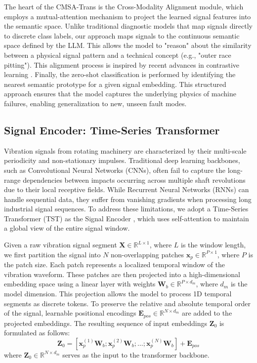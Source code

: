 \documentclass[journal]{IEEEtran}
\begin{document}
The heart of the CMSA-Trans is the Cross-Modality Alignment module, which employs a mutual-attention mechanism to project the learned signal features into the semantic space. Unlike traditional diagnostic models that map signals directly to discrete class labels, our approach maps signals to the continuous semantic space defined by the LLM. This allows the model to "reason" about the similarity between a physical signal pattern and a technical concept (e.g., "outer race pitting"). This alignment process is inspired by recent advances in contrastive learning \cite{radford2021learning, oord2018representation, chen2020simple}. Finally, the zero-shot classification is performed by identifying the nearest semantic prototype for a given signal embedding. This structured approach ensures that the model captures the underlying physics of machine failures, enabling generalization to new, unseen fault modes.

\subsection{Signal Encoder: Time-Series Transformer}
Vibration signals from rotating machinery are characterized by their multi-scale periodicity and non-stationary impulses. Traditional deep learning backbones, such as Convolutional Neural Networks (CNNs), often fail to capture the long-range dependencies between impacts occurring across multiple shaft revolutions due to their local receptive fields. While Recurrent Neural Networks (RNNs) can handle sequential data, they suffer from vanishing gradients when processing long industrial signal sequences. To address these limitations, we adopt a Time-Series Transformer (TST) as the Signal Encoder \cite{zerveas2021transformer}, which uses self-attention to maintain a global view of the entire signal window.

Given a raw vibration signal segment $\mathbf{X} \in \mathbb{R}^{L \times 1}$, where $L$ is the window length, we first partition the signal into $N$ non-overlapping patches $\mathbf{x}_p \in \mathbb{R}^{P \times 1}$, where $P$ is the patch size. Each patch represents a localized temporal window of the vibration waveform. These patches are then projected into a high-dimensional embedding space using a linear layer with weights $\mathbf{W}_b \in \mathbb{R}^{P \times d_m}$, where $d_m$ is the model dimension. This projection allows the model to process 1D temporal segments as discrete tokens. To preserve the relative and absolute temporal order of the signal, learnable positional encodings $\mathbf{E}_{pos} \in \mathbb{R}^{N \times d_m}$ are added to the projected embeddings. The resulting sequence of input embeddings $\mathbf{Z}_0$ is formulated as follows:
\begin{equation}
\mathbf{Z}_0 = [\mathbf{x}_p^{(1)}\mathbf{W}_b; \mathbf{x}_p^{(2)}\mathbf{W}_b; \dots; \mathbf{x}_p^{(N)}\mathbf{W}_b] + \mathbf{E}_{pos}
\end{equation}
where $\mathbf{Z}_0 \in \mathbb{R}^{N \times d_m}$ serves as the input to the transformer backbone.
\end{document}
